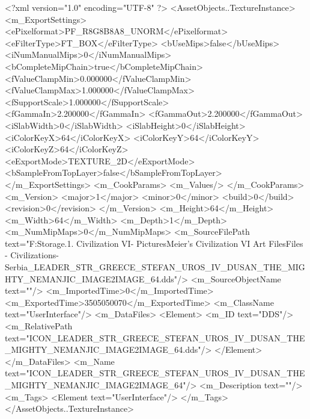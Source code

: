<?xml version="1.0" encoding="UTF-8" ?>
<AssetObjects..TextureInstance>
	<m_ExportSettings>
		<ePixelformat>PF_R8G8B8A8_UNORM</ePixelformat>
		<eFilterType>FT_BOX</eFilterType>
		<bUseMips>false</bUseMips>
		<iNumManualMips>0</iNumManualMips>
		<bCompleteMipChain>true</bCompleteMipChain>
		<fValueClampMin>0.000000</fValueClampMin>
		<fValueClampMax>1.000000</fValueClampMax>
		<fSupportScale>1.000000</fSupportScale>
		<fGammaIn>2.200000</fGammaIn>
		<fGammaOut>2.200000</fGammaOut>
		<iSlabWidth>0</iSlabWidth>
		<iSlabHeight>0</iSlabHeight>
		<iColorKeyX>64</iColorKeyX>
		<iColorKeyY>64</iColorKeyY>
		<iColorKeyZ>64</iColorKeyZ>
		<eExportMode>TEXTURE_2D</eExportMode>
		<bSampleFromTopLayer>false</bSampleFromTopLayer>
	</m_ExportSettings>
	<m_CookParams>
		<m_Values/>
	</m_CookParams>
	<m_Version>
		<major>1</major>
		<minor>0</minor>
		<build>0</build>
		<revision>0</revision>
	</m_Version>
	<m_Height>64</m_Height>
	<m_Width>64</m_Width>
	<m_Depth>1</m_Depth>
	<m_NumMipMaps>0</m_NumMipMaps>
	<m_SourceFilePath text="F:\Mod Storage\2.1. Civilization VI\Mods\Archive - Pictures\Sid Meier's Civilization VI Art Files\Art Files - Civilizations\Civilization - Serbia\ICON_LEADER_STR_GREECE_STEFAN_UROS_IV_DUSAN_THE_MIGHTY_NEMANJIC_IMAGE2IMAGE_64.dds"/>
	<m_SourceObjectName text=""/>
	<m_ImportedTime>0</m_ImportedTime>
	<m_ExportedTime>3505050070</m_ExportedTime>
	<m_ClassName text="UserInterface"/>
	<m_DataFiles>
		<Element>
			<m_ID text="DDS"/>
			<m_RelativePath text="ICON_LEADER_STR_GREECE_STEFAN_UROS_IV_DUSAN_THE_MIGHTY_NEMANJIC_IMAGE2IMAGE_64.dds"/>
		</Element>
	</m_DataFiles>
	<m_Name text="ICON_LEADER_STR_GREECE_STEFAN_UROS_IV_DUSAN_THE_MIGHTY_NEMANJIC_IMAGE2IMAGE_64"/>
	<m_Description text=""/>
	<m_Tags>
		<Element text="UserInterface"/>
	</m_Tags>
</AssetObjects..TextureInstance>

